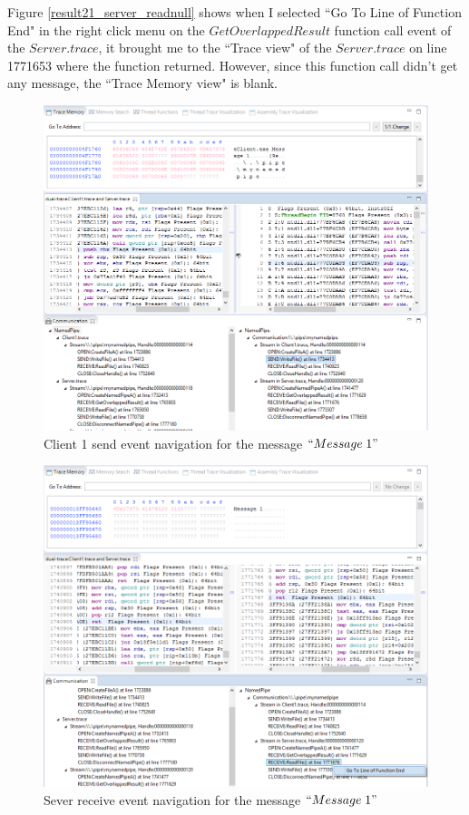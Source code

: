 Figure \ref{result21_server_readnull} shows when I selected ``Go To Line of Function End" in the right click menu on the $GetOverlappedResult$ function call event of the $Server.trace$, it brought me to the ``Trace view" of the $Server.trace$ on line 1771653 where the function returned. However, since this function call didn't get any message, the ``Trace Memory view" is blank.


\begin{figure}
\includegraphics[width=\textwidth]{Figures/result21_client_send}
 \caption{Client 1 send event navigation for the message $``Message\; 1"$}
\label{result21_client_send}
\end{figure}

\begin{figure}
\includegraphics[width=\textwidth]{Figures/result21_server_read}
 \caption{Sever receive event navigation for the message $``Message\; 1"$}
\label{result21_server_read}
\end{figure}

